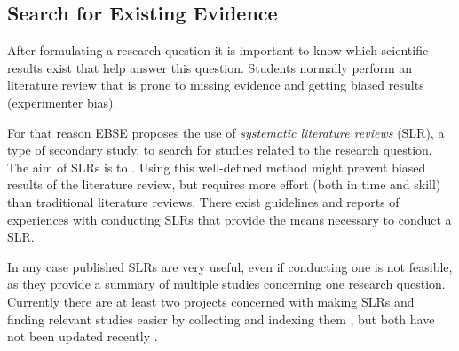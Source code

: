 
\subsection{Search for Existing Evidence}
\label{subsec:search for existing evidence} 

After formulating a research question it is important to know which scientific results exist that help answer this question. Students normally perform an  literature review that is prone to missing evidence and getting biased results (experimenter bias).

For that reason EBSE proposes the use of \emph{systematic literature reviews} (SLR), a type of secondary study, to search for studies related to the research question. The aim of SLRs is to  \cite{Zhang2011}. Using this well-defined method might prevent biased results of the literature review, but requires more effort (both in time and skill) than traditional literature reviews. There exist guidelines \cite{keele2007,Wohlin2014,Zhang2011} and reports of experiences with conducting SLRs \cite{Brereton2007} that provide the means necessary to conduct a SLR.

In any case published SLRs are very useful, even if conducting one is not feasible, as they provide a summary of multiple studies concerning one research question. Currently there are at least two projects concerned with making SLRs and finding relevant studies easier by collecting and indexing them , but both have not been updated recently . 

